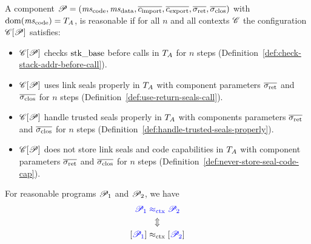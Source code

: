 \documentclass[a4paper]{article}
\begin{document}

\begin{definition}
  A component $\program = (\ms_{\mathrm{code}},\ms_{\mathrm{data}},\overline{c_{\mathrm{import}}},\overline{c_{\mathrm{export}}},\sigrets,\sigcloss)$ with $\mathrm{dom}(\mathit{ms}_{\mathrm{code}}) = T_A$, is reasonable if for all $n$ and all contexts $\mathscr{C}$ the configuration $\mathscr{C}[\mathscr{P}]$ satisfies:
  \begin{itemize}
  \item $\mathscr{C}[\mathscr{P}]$ checks $\mathrm{stk\_base}$ before calls in $T_A$ for $n$ steps (Definition~\ref{def:check-stack-addr-before-call}).
  \item $\mathscr{C}[\mathscr{P}]$ uses link seals properly in $T_A$ with component parameters $\sigrets$ and $\sigcloss$ for $n$ steps (Definition~\ref{def:use-return-seals-call}).
  \item $\mathscr{C}[\mathscr{P}]$ handle trusted seals properly in $T_A$ with components parameters $\sigrets$ and $\sigcloss$ for $n$ steps (Definition~\ref{def:handle-trusted-seals-properly}).
  \item $\mathscr{C}[\mathscr{P}]$ does not store link seals and code capabilities in $T_A$ with component parameters $\sigrets$ and $\sigcloss$ for $n$ steps (Definition~\ref{def:never-store-seal-code-cap}).
  \end{itemize}
\end{definition}

\begin{theorem}
  \label{thm:full-abstraction}
  For reasonable programs $\mathscr{P}_1$ and $\mathscr{P}_2$, we have
  \begin{gather*}
    \src{\program_1} \sconeq \src{\program_2}\\
    \Updownarrow\\
    \comp{\src{\program_1}} \tconeq \comp{\src{\program_2}}
  \end{gather*}
\end{theorem}
\end{document}
